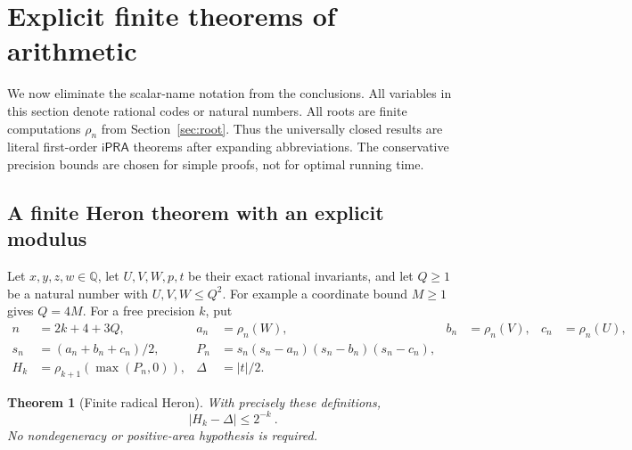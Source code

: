 \documentclass[11pt,a4paper]{article}
\newtheorem{theorem}{Theorem}[section]
\theoremstyle{definition}
\newcommand{\ipra}{\mathsf{iPRA}}
\newcommand{\Q}{\mathbb Q}
\newcommand{\abs}[1]{\left|#1\right|}
\newcommand{\rhoq}[2]{\rho_{#1}\!\left(#2\right)}
\numberwithin{equation}{section}
\begin{document}
\section{Explicit finite theorems of arithmetic}\label{sec:finite}

We now eliminate the scalar-name notation from the conclusions.
All variables in this section denote rational codes or natural
numbers. All roots are finite computations \(\rho_n\) from
Section~\ref{sec:root}. Thus the universally closed results are
literal first-order \(\ipra\) theorems after expanding abbreviations.
The conservative precision bounds are chosen for simple proofs,
not for optimal running time.

\subsection{A finite Heron theorem with an explicit modulus}

Let \(x,y,z,w\in\Q\), let \(U,V,W,p,t\) be their exact rational
invariants, and let \(Q\ge1\) be a natural number with
\(U,V,W\le Q^2\). For example a coordinate bound \(M\ge1\)
gives \(Q=4M\). For a free precision \(k\), put
\begin{align*}
 n&=2k+4+3Q,&
 a_n&=\rhoq nW,& b_n&=\rhoq nV,& c_n&=\rhoq nU,\\
 s_n&=(a_n+b_n+c_n)/2,&
 P_n&=s_n(s_n-a_n)(s_n-b_n)(s_n-c_n),\\
 H_k&=\rhoq{k+1}{\max(P_n,0)},&
 \Delta&=\abs t/2.
\end{align*}

\begin{theorem}[Finite radical Heron]\label{thm:finite-heron}
With precisely these definitions,
\[
 \boxed{\ \abs{H_k-\Delta}\le2^{-k}\ }.
 \tag{8.1}\label{eq:finite-heron}
\]
No nondegeneracy or positive-area hypothesis is required.
\end{theorem}
\end{document}
